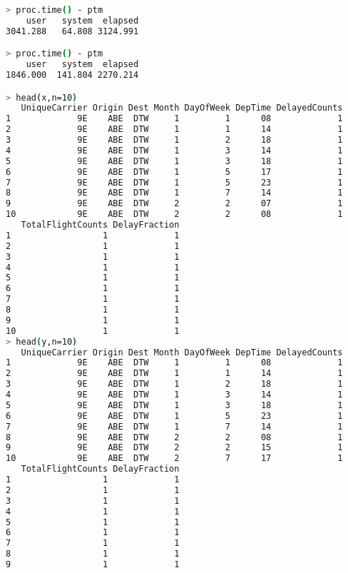 \documentclass{article}\usepackage[]{graphicx}\usepackage[]{color}
\begin{document}
\begin{lstlisting}[language=bash,caption={Timing for the loading, initial (non-indexed) query}]
> proc.time() - ptm
    user   system  elapsed 
3041.288   64.808 3124.991

> proc.time() - ptm
    user   system  elapsed 
1846.000  141.804 2270.214

> head(x,n=10)
   UniqueCarrier Origin Dest Month DayOfWeek DepTime DelayedCounts
1             9E    ABE  DTW     1         1      08             1
2             9E    ABE  DTW     1         1      14             1
3             9E    ABE  DTW     1         2      18             1
4             9E    ABE  DTW     1         3      14             1
5             9E    ABE  DTW     1         3      18             1
6             9E    ABE  DTW     1         5      17             1
7             9E    ABE  DTW     1         5      23             1
8             9E    ABE  DTW     1         7      14             1
9             9E    ABE  DTW     2         2      07             1
10            9E    ABE  DTW     2         2      08             1
   TotalFlightCounts DelayFraction
1                  1             1
2                  1             1
3                  1             1
4                  1             1
5                  1             1
6                  1             1
7                  1             1
8                  1             1
9                  1             1
10                 1             1
> head(y,n=10)
   UniqueCarrier Origin Dest Month DayOfWeek DepTime DelayedCounts
1             9E    ABE  DTW     1         1      08             1
2             9E    ABE  DTW     1         1      14             1
3             9E    ABE  DTW     1         2      18             1
4             9E    ABE  DTW     1         3      14             1
5             9E    ABE  DTW     1         3      18             1
6             9E    ABE  DTW     1         5      23             1
7             9E    ABE  DTW     1         7      14             1
8             9E    ABE  DTW     2         2      08             1
9             9E    ABE  DTW     2         2      15             1
10            9E    ABE  DTW     2         7      17             1
   TotalFlightCounts DelayFraction
1                  1             1
2                  1             1
3                  1             1
4                  1             1
5                  1             1
6                  1             1
7                  1             1
8                  1             1
9                  1             1

\end{lstlisting}
\end{document}
